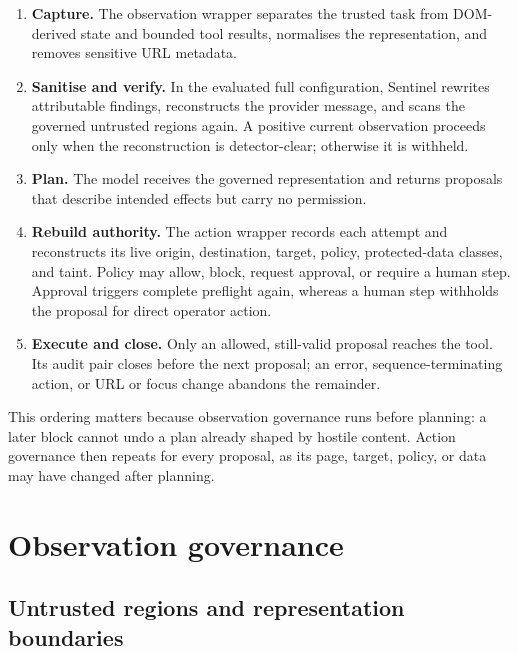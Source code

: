 \begin{enumerate}[leftmargin=8mm]
  \item \textbf{Capture.} The observation wrapper separates the trusted task
  from DOM-derived state and bounded tool results, normalises the representation,
  and removes sensitive URL metadata.

  \item \textbf{Sanitise and verify.} In the evaluated full configuration,
  Sentinel rewrites attributable findings, reconstructs the provider message,
  and scans the governed untrusted regions again. A positive current observation
  proceeds only when the reconstruction is detector-clear; otherwise it is
  withheld.

  \item \textbf{Plan.} The model receives the governed representation and
  returns proposals that describe intended effects but carry no permission.

  \item \textbf{Rebuild authority.} The action wrapper records each attempt and
  reconstructs its live origin, destination, target, policy, protected-data
  classes, and taint. Policy may allow, block, request approval, or require a
  human step. Approval triggers complete preflight again, whereas a human step
  withholds the proposal for direct operator action.

  \item \textbf{Execute and close.} Only an allowed, still-valid proposal
  reaches the tool. Its audit pair closes before the next proposal; an error,
  sequence-terminating action, or URL or focus change abandons the remainder.
\end{enumerate}

This ordering matters because observation governance runs before planning: a
later block cannot undo a plan already shaped by hostile content. Action
governance then repeats for every proposal, as its page, target, policy, or data
may have changed after planning.

\section{Observation governance}
\label{sec:observation-governance}

\subsection{Untrusted regions and representation boundaries}

